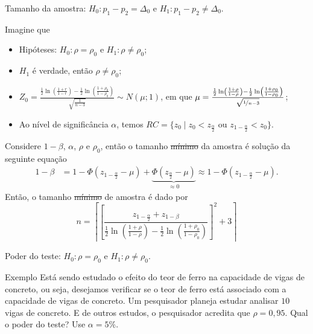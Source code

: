 \documentclass[9pt]{beamer}
\begin{document}
\begin{frame}{Tamanho da amostra: $H_0:p_1 - p_2 = \Delta_0$ e $H_1: p_1 - p_2 \neq \Delta_0$.}

\normalsize
Imagine que
\begin{itemize}
	\item Hipóteses: $H_0:\rho = \rho_0$ e $H_1: \rho \neq \rho_0$;
	\item $H_1$ é verdade, então $\rho \neq \rho_0$;
	\item $Z_0 = \frac{\frac{1}{2} \ln\left( \frac{1 + r}{1 - r} \right) - \frac{1}{2} \ln\left( \frac{1 + \rho_0}{1 - \rho_0} \right)}{\sqrt{\frac{1}{n-3}}} \sim N\left( \mu; 1 \right)$, em que $\mu = \frac{ \frac{1}{2} \ln\left( \frac{1 + \rho}{1 - \rho} \right) -\frac{1}{2} \ln\left( \frac{1 + \rho_0}{1 - \rho_0} \right)  }{\sqrt{\nicefrac{1}{n-3}}}$;
	\item Ao nível de significância $\alpha$, temos $RC = \{ z_0 \mid z_0 < z_{\frac{\alpha}{2}} \mbox{ ou } z_{1-\frac{\alpha}{2}} < z_0  \}$.
\end{itemize}
\vfill

Considere $1-\beta$, $\alpha$, $\rho$ e $\rho_0$, então o tamanho \sout{mínimo} da amostra é solução da seguinte equação
\begin{align*}
1-\beta &= 1 - \Phi\left( z_{1-\frac{\alpha}{2}} - \mu \right) + \underbrace{\Phi\left( z_{\frac{\alpha}{2}} - \mu \right)}_{\approx 0} \approx 1 - \Phi\left( z_{1-\frac{\alpha}{2}} - \mu \right).
\end{align*}
Então, o tamanho \sout{mínimo} de amostra é dado por
$$n = \left\lceil \left[\frac{z_{1-\frac{\alpha}{2}} + z_{1-\beta} }{ \frac{1}{2} \ln \left( \frac{1 + \rho}{1 - \rho} \right) - \frac{1}{2} \ln \left( \frac{1 + \rho_0}{1 - \rho_0} \right) }\right]^2 + 3 \right\rceil $$
\normalsize

\end{frame}

\begin{frame}{Poder do teste: $H_0:\rho = \rho_0$ e $H_1: \rho \neq \rho_0$.}

\begin{block}{Exemplo}
	Está sendo estudado o efeito do teor de ferro na capacidade de vigas de concreto, ou seja, desejamos verificar se o teor de ferro está associado com a capacidade de vigas de concreto. Um pesquisador planeja estudar analisar $10$ vigas de concreto. E de outros estudos, o pesquisador acredita que $\rho = 0,95$. Qual o poder do teste? Use $\alpha=5\%$.

\end{block}

\end{frame}
\end{document}
